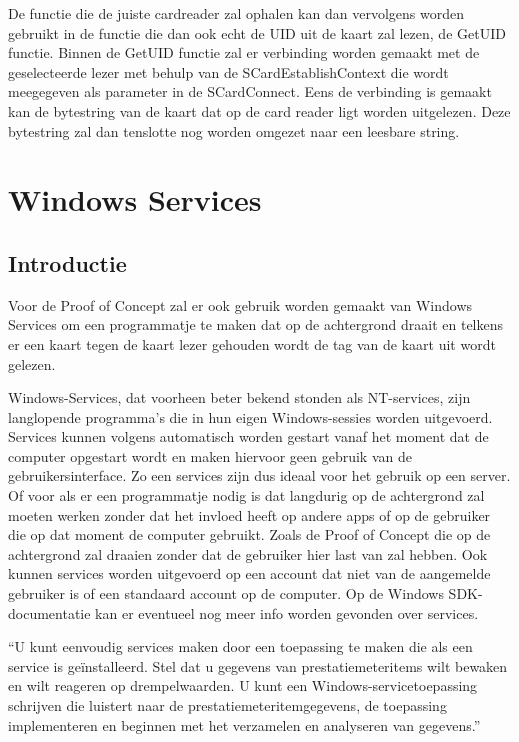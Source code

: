 De functie die de juiste cardreader zal ophalen kan dan vervolgens worden gebruikt in de functie die dan ook echt de UID uit de kaart zal lezen, de GetUID functie. Binnen de GetUID functie zal er verbinding worden gemaakt met de geselecteerde lezer met behulp van de SCardEstablishContext die wordt meegegeven als parameter in de SCardConnect. Eens de verbinding is gemaakt kan de bytestring van de kaart dat op de card reader ligt worden uitgelezen. Deze bytestring zal dan tenslotte nog worden omgezet naar een leesbare string. 




\section{Windows Services}
\subsection{Introductie}
Voor de Proof of Concept zal er ook gebruik worden gemaakt van Windows Services om een programmatje te maken dat op de achtergrond draait en telkens er een kaart tegen de kaart lezer gehouden wordt de tag van de kaart uit wordt gelezen. 

Windows-Services, dat voorheen beter bekend stonden als NT-services, zijn langlopende programma's die in hun eigen Windows-sessies worden uitgevoerd. Services kunnen volgens \textcite{DevMozService} automatisch worden gestart vanaf het moment dat de computer opgestart wordt en maken hiervoor geen gebruik van de gebruikersinterface. Zo een services zijn dus ideaal voor het gebruik op een server. Of voor als er een programmatje nodig is dat langdurig op de achtergrond zal moeten werken zonder dat het invloed heeft op andere apps of op de gebruiker die op dat moment de computer gebruikt. Zoals de Proof of Concept die op de achtergrond zal draaien zonder dat de gebruiker hier last van zal hebben. Ook kunnen services worden uitgevoerd op een account dat niet van de aangemelde gebruiker is of een standaard account op de computer. Op de Windows SDK-documentatie kan er eventueel nog meer info worden gevonden over services. 

``U kunt eenvoudig services maken door een toepassing te maken die als een service is geïnstalleerd. Stel dat u gegevens van prestatiemeteritems wilt bewaken en wilt reageren op drempelwaarden. U kunt een Windows-servicetoepassing schrijven die luistert naar de prestatiemeteritemgegevens, de toepassing implementeren en beginnen met het verzamelen en analyseren van gegevens.''\autocite{DevMozService}


